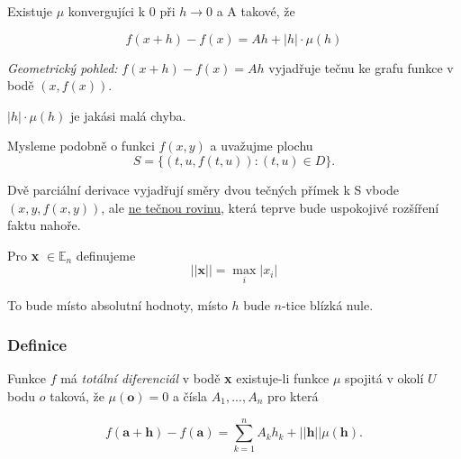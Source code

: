 \documentclass[../main.tex]{subfiles}
\begin{document}
\noindent
\hspace{1.2mm}
Existuje $\mu$ konvergujíci k 0 při $h \rightarrow 0$ a A takové, že 

\[f(x+h) - f(x) = Ah + |h| \cdot \mu(h)\]

\hspace{1.2mm}
\noindent
\textit{Geometrický pohled:}
$f(x+h) - f(x) = Ah$ vyjadřuje tečnu ke grafu funkce v bodě $(x,f(x)).$

\noindent
\hspace{1.2mm}
$|h|\cdot \mu(h)$ je jakási malá chyba.

\noindent
\hspace{1.2mm}
Mysleme podobně o funkci $f(x,y)$ a uvažujme plochu 
\[S = \{(t,u,f(t,u)) : (t,u) \in D\}.\]

\noindent
\hspace{1.2mm}
Dvě parciální derivace vyjadřují směry dvou tečných přímek k S vbode $(x,y,f(x,y))$, ale \underline{ne tečnou rovinu}, 
která teprve bude uspokojivé rozšíření faktu nahoře.

\noindent
\hspace{1.2mm}
Pro \textbf{x} $\in \mathbb{E}_n$ definujeme
\[||\textbf{x}||  = \max_i|x_i|\]

\noindent
\hspace{1.2mm}
To bude místo absolutní hodnoty, místo $h$ bude $n$-tice blízká nule.

\subsubsection{Definice}
\hspace{1.2mm}
Funkce $f$ má \textit{totální diferenciál} v bodě \textbf{x} existuje-li funkce $\mu$ spojitá v okolí $U$ bodu $o$ taková, že $\mu(\textbf{o}) = 0$
a čísla $A_1,...,A_n$ pro která

\[f(\textbf{a}+\textbf{h}) - f(\textbf{a}) = \sum^n_{k=1}A_kh_k+||\textbf{h}||\mu(\textbf{h}).\]

\end{document}

